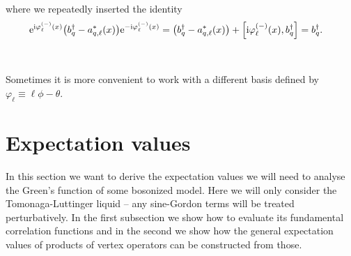 \documentclass[english, parskip=full]{scrartcl}
\begin{document}
where we repeatedly inserted the identity
\begin{align}
\powe{\i\varphi_\ell^{(-)}(x)} \kla*{b_q^\dagger - a_{q,\ell}^\ast(x)} \powe{-\i\varphi_\ell^{(-)}(x)} &= \kla*{b_q^\dagger - a_{q,\ell}^\ast(x)} + \klb*{\i\varphi_\ell^{(-)}(x), b_q^\dagger} = b_q^\dagger.
\end{align}
\\
\\
Sometimes it is more convenient to work with a different basis defined by $\varphi_\ell \equiv \ell \phi - \theta$.
\section{Expectation values}
In this section we want to derive the expectation values we will need to analyse the Green's function of some bosonized model.
Here we will only consider the Tomonaga-Luttinger liquid -- any sine-Gordon terms will be treated perturbatively.
In the first subsection we show how to evaluate its fundamental correlation functions and in the second we show how the general expectation values of products of vertex operators can be constructed from those.
\end{document}

